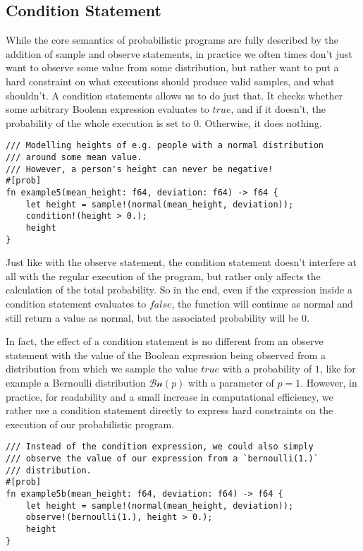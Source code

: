 \subsection{Condition Statement}

While the core semantics of probabilistic programs are fully described by the addition of sample and observe statements, in practice we often times don't just want to observe some value from some distribution, but rather want to put a hard constraint on what executions should produce valid samples, and what shouldn't. A condition statements allows us to do just that. It checks whether some arbitrary Boolean expression evaluates to $true$, and if it doesn't, the probability of the whole execution is set to $0$. Otherwise, it does nothing.

\begin{minipage}{\linewidth}
\begin{lstlisting}
/// Modelling heights of e.g. people with a normal distribution
/// around some mean value.
/// However, a person's height can never be negative!
#[prob]
fn example5(mean_height: f64, deviation: f64) -> f64 {
    let height = sample!(normal(mean_height, deviation));
    condition!(height > 0.);
    height
}
\end{lstlisting}
\end{minipage}

Just like with the observe statement, the condition statement doesn't interfere at all with the regular execution of the program, but rather only affects the calculation of the total probability. So in the end, even if the expression inside a condition statement evaluates to $false$, the function will continue as normal and still return a value as normal, but the associated probability will be $0$.

In fact, the effect of a condition statement is no different from an observe statement with the value of the Boolean expression being observed from a distribution from which we sample the value $true$ with a probability of $1$, like for example a Bernoulli distribution $\mathcal{Bn}(p)$ with a parameter of $p=1$. However, in practice, for readability and a small increase in computational efficiency, we rather use a condition statement directly to express hard constraints on the execution of our probabilistic program.

\begin{minipage}{\linewidth}
\begin{lstlisting}
/// Instead of the condition expression, we could also simply
/// observe the value of our expression from a `bernoulli(1.)`
/// distribution.
#[prob]
fn example5b(mean_height: f64, deviation: f64) -> f64 {
    let height = sample!(normal(mean_height, deviation));
    observe!(bernoulli(1.), height > 0.);
    height
}
\end{lstlisting}
\end{minipage}

